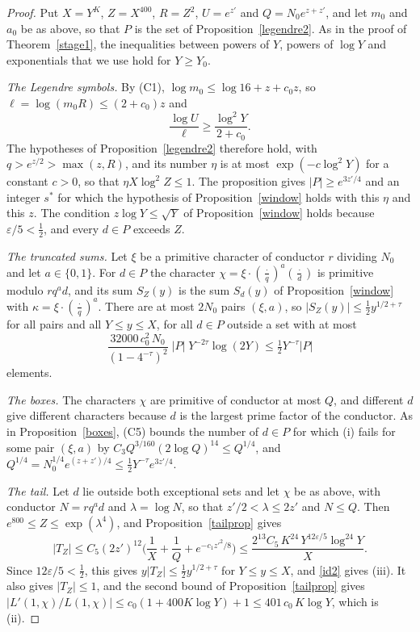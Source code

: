 \begin{proof}
Put $X=Y^K$, $Z=X^{400}$, $R=Z^2$, $U=e^{z'}$ and $Q=N_0e^{z+z'}$, and let $m_0$ and $a_0$ be as above, so that $P$ is the set of Proposition~\ref{legendre2}. As in the proof of Theorem~\ref{stage1}, the inequalities between powers of $Y$, powers of $\log Y$ and exponentials that we use hold for $Y\ge Y_0$.

\emph{The Legendre symbols.} By (C1), $\log m_0\le\log16+z+c_0z$, so $\ell=\log(m_0R)\le(2+c_0)z$ and
\[
\frac{\log U}{\ell}\ge\frac{\log^2Y}{2+c_0}.
\]
The hypotheses of Proposition~\ref{legendre2} therefore hold, with $q>e^{z/2}>\max(z,R)$, and its number $\eta$ is at most $\exp(-c\log^2Y)$ for a constant $c>0$, so that $\eta X\log^2Z\le1$. The proposition gives $\lvert P\rvert\ge e^{3z'/4}$ and an integer $s^\ast$ for which the hypothesis of Proposition~\ref{window} holds with this $\eta$ and this $z$. The condition $z\log Y\le\sqrt Y$ of Proposition~\ref{window} holds because $\varepsilon/5<\frac12$, and every $d\in P$ exceeds $Z$.

\emph{The truncated sums.} Let $\xi$ be a primitive character of conductor $r$ dividing $N_0$ and let $a\in\{0,1\}$. For $d\in P$ the character $\chi=\xi\cdot(\frac{\cdot}{q})^a(\frac{\cdot}{d})$ is primitive modulo $rq^ad$, and its sum $S_Z(y)$ is the sum $S_d(y)$ of Proposition~\ref{window} with $\kappa=\xi\cdot(\frac{\cdot}{q})^a$. There are at most $2N_0$ pairs $(\xi,a)$, so $\lvert S_Z(y)\rvert\le\frac12y^{1/2+\tau}$ for all pairs and all $Y\le y\le X$, for all $d\in P$ outside a set with at most
\[
\frac{32000\,c_0^2\,N_0}{(1-4^{-\tau})^2}\;\lvert P\rvert\;Y^{-2\tau}\log(2Y)\le\tfrac12Y^{-\tau}\lvert P\rvert
\]
elements.

\emph{The boxes.} The characters $\chi$ are primitive of conductor at most $Q$, and different $d$ give different characters because $d$ is the largest prime factor of the conductor. As in Proposition~\ref{boxes}, (C5) bounds the number of $d\in P$ for which (i) fails for some pair $(\xi,a)$ by $C_3Q^{3/160}(2\log Q)^{14}\le Q^{1/4}$, and $Q^{1/4}=N_0^{1/4}e^{(z+z')/4}\le\frac12Y^{-\tau}e^{3z'/4}$.

\emph{The tail.} Let $d$ lie outside both exceptional sets and let $\chi$ be as above, with conductor $N=rq^ad$ and $\lambda=\log N$, so that $z'/2<\lambda\le2z'$ and $N\le Q$. Then $e^{800}\le Z\le\exp(\lambda^4)$, and Proposition~\ref{tailprop} gives
\[
\lvert T_Z\rvert\le C_5(2z')^{12}\Big(\frac1X+\frac1Q+e^{-c_1z'^2/8}\Big)\le\frac{2^{13}C_5\,K^{24}\,Y^{12\varepsilon/5}\log^{24}Y}X .
\]
Since $12\varepsilon/5<\frac12$, this gives $y\lvert T_Z\rvert\le\frac12y^{1/2+\tau}$ for $Y\le y\le X$, and \eqref{id2} gives (iii). It also gives $\lvert T_Z\rvert\le1$, and the second bound of Proposition~\ref{tailprop} gives $\lvert L'(1,\chi)/L(1,\chi)\rvert\le c_0(1+400K\log Y)+1\le401\,c_0\,K\log Y$, which is (ii).
\end{proof}

